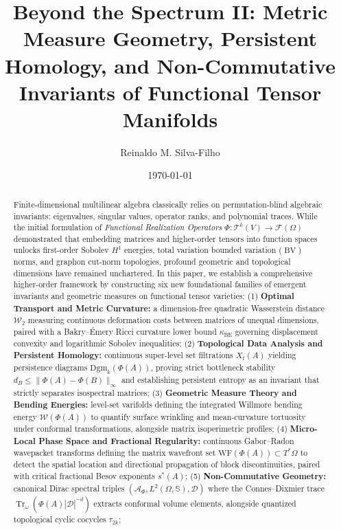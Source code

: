 \documentclass[11pt,a4paper,reqno]{amsart}
\theoremstyle{definition}
\numberwithin{equation}{section}
\newcommand{\Tr}{\operatorname{Tr}}
\newcommand{\BV}{\operatorname{BV}}
\begin{document}
\title[Beyond the Spectrum II]{Beyond the Spectrum II: Metric Measure Geometry, Persistent Homology, and Non-Commutative Invariants of Functional Tensor Manifolds}

\author{Reinaldo M. Silva-Filho}
\address{Universidade Federal de Lavras (UFLA), Departamento de Estat\'istica e Experimenta\c{c}\~ao Agropecu\'aria (PPGEEAA/DES)}
\date{\today}

\begin{abstract}
Finite-dimensional multilinear algebra classically relies on permutation-blind algebraic invariants: eigenvalues, singular values, operator ranks, and polynomial traces. While the initial formulation of \emph{Functional Realization Operators} $\Phi \colon \mathcal{T}^k(V) \to \mathcal{F}(\Omega)$ demonstrated that embedding matrices and higher-order tensors into function spaces unlocks first-order Sobolev $H^1$ energies, total variation bounded variation ($\BV$) norms, and graphon cut-norm topologies, profound geometric and topological dimensions have remained unchartered. In this paper, we establish a comprehensive higher-order framework by constructing six new foundational families of emergent invariants and geometric measures on functional tensor varieties:
(1) \textbf{Optimal Transport and Metric Curvature:} a dimension-free quadratic Wasserstein distance $\mathcal{W}_2$ measuring continuous deformation costs between matrices of unequal dimensions, paired with a Bakry--\'Emery Ricci curvature lower bound $\kappa_{\mathrm{BE}}$ governing displacement convexity and logarithmic Sobolev inequalities;
(2) \textbf{Topological Data Analysis and Persistent Homology:} continuous super-level set filtrations $X_t(A)$ yielding persistence diagrams $\mathrm{Dgm}_k(\Phi(A))$, proving strict bottleneck stability $d_B \le \|\Phi(A) - \Phi(B)\|_\infty$ and establishing persistent entropy as an invariant that strictly separates isospectral matrices;
(3) \textbf{Geometric Measure Theory and Bending Energies:} level-set varifolds defining the integrated Willmore bending energy $\mathcal{W}(\Phi(A))$ to quantify surface wrinkling and mean-curvature tortuosity under conformal transformations, alongside matrix isoperimetric profiles;
(4) \textbf{Micro-Local Phase Space and Fractional Regularity:} continuous Gabor--Radon wavepacket transforms defining the matrix wavefront set $\mathrm{WF}(\Phi(A)) \subset T^*\Omega$ to detect the spatial location and directional propagation of block discontinuities, paired with critical fractional Besov exponents $s^*(A)$;
(5) \textbf{Non-Commutative Geometry:} canonical Dirac spectral triples $(\mathcal{A}_\Phi, L^2(\Omega, \mathbb{S}), \mathcal{D})$ where the Connes--Dixmier trace $\Tr_\omega(\Phi(A)|\mathcal{D}|^{-d})$ extracts conformal volume elements, alongside quantized topological cyclic cocycles $\tau_{2k}$;

\end{abstract}
\end{document}
